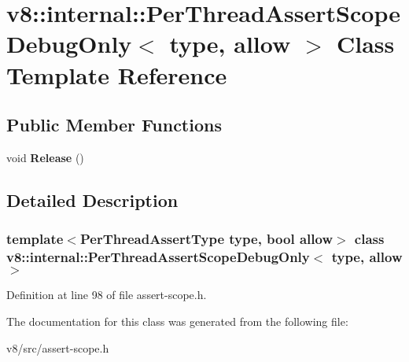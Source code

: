 \hypertarget{classv8_1_1internal_1_1PerThreadAssertScopeDebugOnly}{}\section{v8\+:\+:internal\+:\+:Per\+Thread\+Assert\+Scope\+Debug\+Only$<$ type, allow $>$ Class Template Reference}
\label{classv8_1_1internal_1_1PerThreadAssertScopeDebugOnly}
\subsection*{Public Member Functions}
\begin{DoxyCompactItemize}
\item 
\mbox{\label{classv8_1_1internal_1_1PerThreadAssertScopeDebugOnly_a532a8094abd3f08682c1c0c8306509dd}} 
void {\bfseries Release} ()
\end{DoxyCompactItemize}


\subsection{Detailed Description}
\subsubsection*{template$<$Per\+Thread\+Assert\+Type type, bool allow$>$\newline
class v8\+::internal\+::\+Per\+Thread\+Assert\+Scope\+Debug\+Only$<$ type, allow $>$}



Definition at line 98 of file assert-\/scope.\+h.



The documentation for this class was generated from the following file\+:\begin{DoxyCompactItemize}
\item 
v8/src/assert-\/scope.\+h\end{DoxyCompactItemize}
